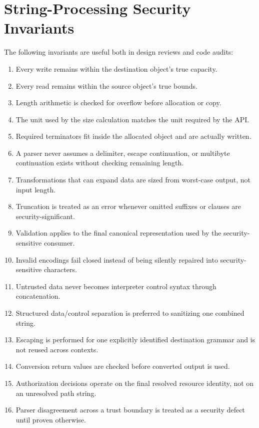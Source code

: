 \documentclass[11pt]{article}
\begin{document}
\section{String-Processing Security Invariants}

The following invariants are useful both in design reviews and code audits:

\begin{enumerate}
  \item Every write remains within the destination object's true capacity.
  \item Every read remains within the source object's true bounds.
  \item Length arithmetic is checked for overflow before allocation or copy.
  \item The unit used by the size calculation matches the unit required by the API.
  \item Required terminators fit inside the allocated object and are actually written.
  \item A parser never assumes a delimiter, escape continuation, or multibyte continuation exists without checking remaining length.
  \item Transformations that can expand data are sized from worst-case output, not input length.
  \item Truncation is treated as an error whenever omitted suffixes or clauses are security-significant.
  \item Validation applies to the final canonical representation used by the security-sensitive consumer.
  \item Invalid encodings fail closed instead of being silently repaired into security-sensitive characters.
  \item Untrusted data never becomes interpreter control syntax through concatenation.
  \item Structured data/control separation is preferred to sanitizing one combined string.
  \item Escaping is performed for one explicitly identified destination grammar and is not reused across contexts.
  \item Conversion return values are checked before converted output is used.
  \item Authorization decisions operate on the final resolved resource identity, not on an unresolved path string.
  \item Parser disagreement across a trust boundary is treated as a security defect until proven otherwise.
\end{enumerate}
\clearpage
\end{document}
